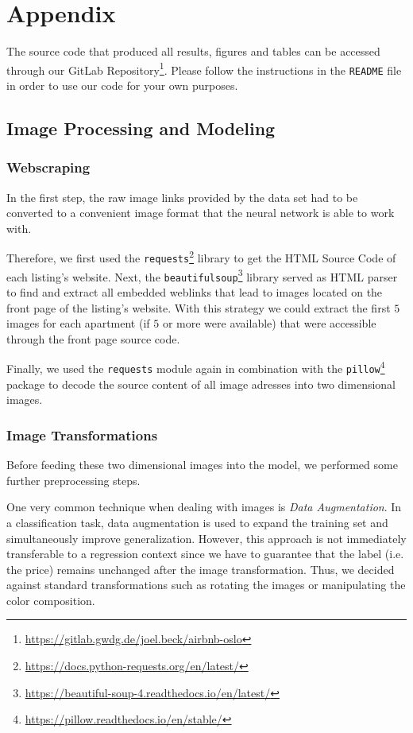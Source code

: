 \newpage
\appendix
\section{Appendix}

The source code that produced all results, figures and tables can be accessed through our GitLab Repository\footnote{\url{https://gitlab.gwdg.de/joel.beck/airbnb-oslo}}.
Please follow the instructions in the \texttt{README} file in order to use our code for your own purposes.

\subsection{Image Processing and Modeling} \label{appendix:images}

\subsubsection{Webscraping}

In the first step, the raw image links provided by the data set had to be converted to a convenient image format that the neural network is able to work with.

Therefore, we first used the \texttt{requests}\footnote{\url{https://docs.python-requests.org/en/latest/}} library to get the HTML Source Code of each listing's website.
Next, the \texttt{beautifulsoup}\footnote{\url{https://beautiful-soup-4.readthedocs.io/en/latest/}} library served as HTML parser to find and extract all embedded weblinks that lead to images located on the front page of the listing's website.
With this strategy we could extract the first $5$ images for each apartment (if $5$ or more were available) that were accessible through the front page source code.

Finally, we used the \texttt{requests} module again in combination with the \texttt{pillow}\footnote{\url{https://pillow.readthedocs.io/en/stable/}} package to decode the source content of all image adresses into two dimensional images.

\subsubsection{Image Transformations}

Before feeding these two dimensional images into the model, we performed some further preprocessing steps.

One very common technique when dealing with images is \emph{Data Augmentation}.
In a classification task, data augmentation is used to expand the training set and simultaneously improve generalization. However, this approach is not immediately transferable to a regression context since we have to guarantee that the label (i.e. the price) remains unchanged after the image transformation.
Thus, we decided against standard transformations such as rotating the images or manipulating the color composition.

